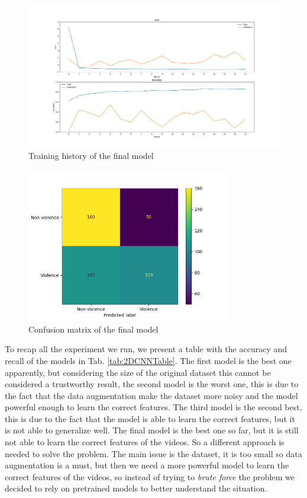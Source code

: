 \begin{figure}[]
    \centering
    \includegraphics[width=1\textwidth]{images/731a-medium7Dropout4-b538-history.png}
    \caption{Training history of the final model}
    \label{fig:Final2DCNNHistory}
\end{figure}
\begin{figure}[]
    \centering
    \includegraphics[width=0.8\textwidth]{images/731a-medium7Dropout4-b538-conf_matrix.png}
    \caption{Confusion matrix of the final model}
    \label{fig:Final2DCNNMatrix}
\end{figure}

To recap all the experiment we run, we present a table with the accuracy and recall of the models in Tab. \ref{tab:2DCNNTable}. The first model is the best one apparently, but considering the size of the original dataset this cannot be considered a trustworthy result, the second model is the worst one, this is due to the fact that the data augmentation make the dataset more noisy and the model powerful enough to learn the correct features. The third model is the second best, this is due to the fact that the model is able to learn the correct features, but it is not able to generalize well. The final model is the best one so far, but it is still not able to learn the correct features of the videos. So a different approach is needed to solve the problem. The main issue is the dataset, it is too small so data augmentation is a must, but then we need a more powerful model to learn the correct features of the videos, so instead of trying to \textit{brute force} the problem we decided to rely on pretrained models to better understand the situation.

